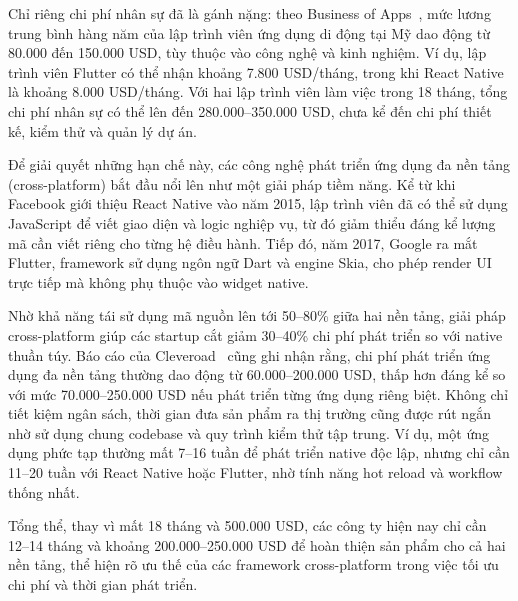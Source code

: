 \begin{flushleft}
    \hspace*{0.8cm}Chỉ riêng chi phí nhân sự đã là gánh nặng: theo Business of Apps~\cite{businessofapps2025}, mức lương trung bình hàng năm của lập trình viên ứng dụng di động tại Mỹ dao động từ 80.000 đến 150.000 USD, tùy thuộc vào công nghệ và kinh nghiệm. Ví dụ, lập trình viên Flutter có thể nhận khoảng 7.800 USD/tháng, trong khi React Native là khoảng 8.000 USD/tháng. Với hai lập trình viên làm việc trong 18 tháng, tổng chi phí nhân sự có thể lên đến 280.000--350.000 USD, chưa kể đến chi phí thiết kế, kiểm thử và quản lý dự án.
\end{flushleft}

\begin{flushleft}
    \hspace*{0.8cm}Để giải quyết những hạn chế này, các công nghệ phát triển ứng dụng đa nền tảng (cross-platform) bắt đầu nổi lên như một giải pháp tiềm năng. Kể từ khi Facebook giới thiệu React Native vào năm 2015, lập trình viên đã có thể sử dụng JavaScript để viết giao diện và logic nghiệp vụ, từ đó giảm thiểu đáng kể lượng mã cần viết riêng cho từng hệ điều hành. Tiếp đó, năm 2017, Google ra mắt Flutter, framework sử dụng ngôn ngữ Dart và engine Skia, cho phép render UI trực tiếp mà không phụ thuộc vào widget native.
\end{flushleft}

\begin{flushleft}
    \hspace*{0.8cm}Nhờ khả năng tái sử dụng mã nguồn lên tới 50--80\% giữa hai nền tảng, giải pháp cross-platform giúp các startup cắt giảm 30--40\% chi phí phát triển so với native thuần túy. Báo cáo của Cleveroad~\cite{cleveroad} cũng ghi nhận rằng, chi phí phát triển ứng dụng đa nền tảng thường dao động từ 60.000--200.000 USD, thấp hơn đáng kể so với mức 70.000--250.000 USD nếu phát triển từng ứng dụng riêng biệt. Không chỉ tiết kiệm ngân sách, thời gian đưa sản phẩm ra thị trường cũng được rút ngắn nhờ sử dụng chung codebase và quy trình kiểm thử tập trung. Ví dụ, một ứng dụng phức tạp thường mất 7--16 tuần để phát triển native độc lập, nhưng chỉ cần 11--20 tuần với React Native hoặc Flutter, nhờ tính năng hot reload và workflow thống nhất.
\end{flushleft}

\begin{flushleft}
    \hspace*{0.8cm}Tổng thể, thay vì mất 18 tháng và 500.000 USD, các công ty hiện nay chỉ cần 12--14 tháng và khoảng 200.000--250.000 USD để hoàn thiện sản phẩm cho cả hai nền tảng, thể hiện rõ ưu thế của các framework cross-platform trong việc tối ưu chi phí và thời gian phát triển.
\end{flushleft}

